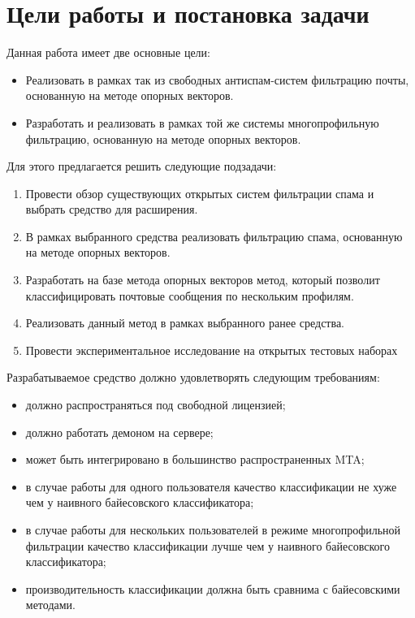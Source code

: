 \newpage
\section{Цели работы и постановка задачи}


Данная работа имеет две основные цели:
\begin{itemize}
\item Реализовать в рамках так из свободных антиспам-систем фильтрацию почты, основанную на методе опорных векторов.
\item Разработать и реализовать в рамках той же системы многопрофильную фильтрацию, основанную на методе опорных векторов.
\end{itemize}

Для этого предлагается решить следующие подзадачи:
\begin{enumerate}
\item  Провести обзор существующих открытых систем фильтрации спама и выбрать средство для расширения. 
\item В рамках выбранного средства реализовать фильтрацию спама, основанную на методе опорных векторов.
\item Разработать на базе метода опорных векторов метод, который позволит классифицировать почтовые сообщения по нескольким профилям.
\item Реализовать данный метод в рамках выбранного ранее средства.
\item Провести экспериментальное исследование на открытых тестовых наборах
\end{enumerate}

Разрабатываемое средство должно удовлетворять следующим требованиям:
\begin{itemize}
\item должно распространяться под свободной лицензией;
\item должно работать демоном на сервере;
\item может быть интегрировано в большинство распространенных MTA;
\item в случае работы для одного пользователя качество классификации не хуже чем у наивного байесовского классификатора;
\item в случае работы для нескольких пользователей в режиме многопрофильной фильтрации качество классификации лучше чем у наивного байесовского классификатора;
\item производительность классификации должна быть сравнима с байесовскими методами.
\end{itemize}
